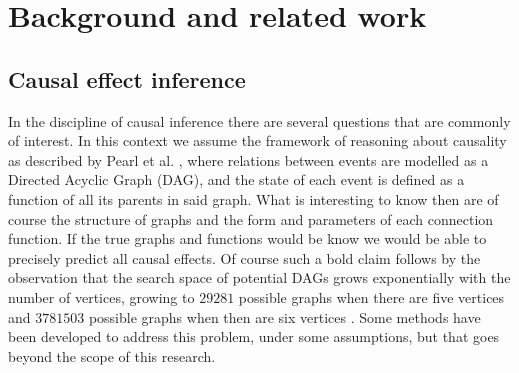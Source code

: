 \documentclass{report}
\newcommand{\bx}{\mathbf{x}}
\newcommand{\bZ}{\mathbf{Z}}
\begin{document}





\chapter{Background and related work}
\section{Causal effect inference}
In the discipline of causal inference there are several questions that are commonly of interest. In this context we assume the framework of reasoning about causality as described by Pearl et al. \cite{pearl2009causal}, where relations between events are modelled as a Directed Acyclic Graph (DAG), and the state of each event is defined as a function of all its parents in said graph. What is interesting to know then are of course the structure of graphs and the form and parameters of each connection function. If the true graphs and functions would be know we would be able to precisely predict all causal effects. Of course such a bold claim follows by the observation that the search space of potential DAGs grows exponentially with the number of vertices, growing to $29281$ possible graphs when there are five vertices and $3781503$ possible graphs when then are six vertices \cite{robinson1977counting}. Some methods have been developed to address this problem, under some assumptions, but that goes beyond the scope of this research.
\end{document}
